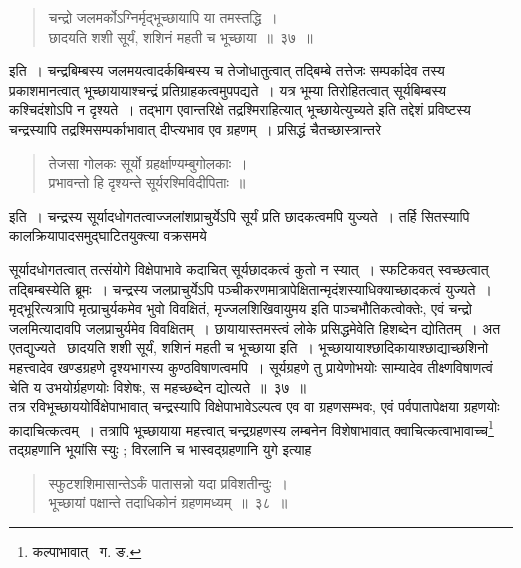 \documentclass[11pt, openany]{book}
\begin{document}
\begin{quote}
{\ab चन्द्रो जलमर्कोऽग्निर्मृद्भूच्छायापि या तमस्तद्धि~।\\
छादयति शशी सूर्यं, शशिनं महती च भूच्छाया~॥~३७~॥}  
\end{quote}
 
\indent इति~। चन्द्रबिम्बस्य जलमयत्वादर्कबिम्बस्य च तेजोधातुत्वात् तद्बिम्बे तत्तेजः सम्पर्कादेव तस्य प्रकाशमानत्वात् भूच्छायायाश्चन्द्रं
प्रतिग्राहकत्वमुपपद्यते~। यत्र भूम्या तिरोहितत्वात् सूर्यबिम्बस्य कश्चिदंशोऽपि न दृश्यते~। तद्भाग एवान्तरिक्षे तद्रश्मिराहित्यात् भूच्छायेत्युच्यते
इति तद्देशं प्रविष्टस्य चन्द्रस्यापि तद्रश्मिसम्पर्काभावात् दीप्त्यभाव एव ग्रहणम्~। प्रसिद्धं चैतच्छास्त्रान्तरे\textendash 

\begin{quote}
{\qt तेजसा गोलकः सूर्यो ग्रहर्क्षाण्यम्बुगोलकाः~।\\
प्रभावन्तो हि दृश्यन्ते सूर्यरश्मिविदीपिताः~॥}
\end{quote}
	
\noindent इति~। चन्द्रस्य सूर्यादधोगतत्वाज्जलांशप्राचुर्येऽपि सूर्यं प्रति छादकत्वमपि युज्यते~। तर्हि सितस्यापि कालक्रियापादसमुद्घाटितयुक्त्या
वक्रसमये

\newpage

\noindent सूर्यादधोगतत्वात् तत्संयोगे विक्षेपाभावे कदाचित् सूर्यछादकत्वं कुतो न स्यात्~। स्फटिकवत् स्वच्छत्वात् तद्बिम्बस्येति ब्रूमः~। चन्द्रस्य जलप्राचुर्येऽपि पञ्चीकरणमात्रापेक्षितान्मृदंशस्याधिक्याच्छादकत्वं युज्यते~। मृद्भूरित्यत्रापि मृत्प्राचुर्यकमेव भुवो विवक्षितं, मृज्जलशिखिवायुमय इति पाञ्चभौतिकत्वोक्तेः, एवं चन्द्रो जलमित्यादावपि जलप्राचुर्यमेव विवक्षितम्~। छायायास्तमस्त्वं लोके प्रसिद्धमेवेति हिशब्देन द्योतितम्~। अत एतद्युज्यते \textendash\ {\qt छादयति शशी सूर्यं, शशिनं महती च भूच्छाया} इति~। भूच्छायायाश्छादिकायाश्छाद्याच्छशिनो महत्त्वादेव खण्डग्रहणे दृश्यभागस्य कुण्ठविषाणत्वमपि~। सूर्यग्रहणे तु प्रायेणोभयोः साम्यादेव तीक्ष्णविषाणत्वं चेति य उभयोर्ग्रहणयोः विशेषः, स महच्छब्देन द्योत्यते~॥~३७~॥ \\

\indent तत्र रविभूच्छाययोर्विक्षेपाभावात् चन्द्रस्यापि विक्षेपाभावेऽल्पत्व एव वा ग्रहणसम्भवः, एवं पर्वपातापेक्षया ग्रहणयोः कादाचित्कत्वम्~। तत्रापि भूच्छायाया महत्त्वात् चन्द्रग्रहणस्य लम्बनेन विशेषाभावात् क्वाचित्कत्वाभावाच्च\renewcommand{\thefootnote}{१}\footnote{कल्पाभावात् \textendash\ ग. ङ.} तद्ग्रहणानि भूयांसि स्युः ; विरलानि च भास्वद्ग्रहणानि युगे इत्याह\textendash  

\begin{quote}
{\ab स्फुटशशिमासान्तेऽर्कं पातासन्नो यदा प्रविशतीन्दुः~।\\
     भूच्छायां पक्षान्ते तदाधिकोनं ग्रहणमध्यम्~॥~३८~॥}
\end{quote}
\end{document}
